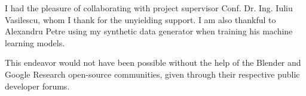 \vspace*{7cm}

\begin{center}
I had the pleasure of collaborating with project supervisor Conf. Dr. Ing. Iuliu Vasilescu, whom I thank for the unyielding support. I am also thankful to Alexandru Petre using my synthetic data generator when training his machine learning models.
\end{center}

\vspace{0.6cm}


\begin{center}
This endeavor would not have been possible without the help of the Blender and Google Research open-source communities, given through their respective public developer forums. 
\end{center}
